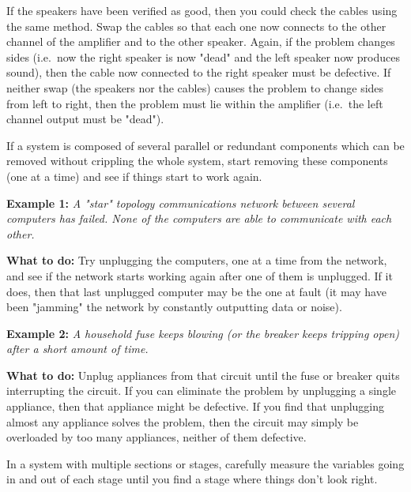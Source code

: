 If the speakers have been verified as good, then you could check the
cables using the same method. Swap the cables so that each one now
connects to the other channel of the amplifier and to the other speaker.
Again, if the problem changes sides (i.e.~now the right speaker is now
"dead" and the left speaker now produces sound), then the cable now
connected to the right speaker must be defective. If neither swap (the
speakers nor the cables) causes the problem to change sides from left to
right, then the problem must lie within the amplifier (i.e.~the left
channel output must be "dead").

\stopsubsection

\startsubsection[title={Remove Parallel
Components},reference={sec:xtocid15790979}]

If a system is composed of several parallel or redundant components
which can be removed without crippling the whole system, start removing
these components (one at a time) and see if things start to work again.

{\bf Example 1:} {\em A "star" topology communications network between
several computers has failed. None of the computers are able to
communicate with each other.}

{\bf What to do:} Try unplugging the computers, one at a time from the
network, and see if the network starts working again after one of them
is unplugged. If it does, then that last unplugged computer may be the
one at fault (it may have been "jamming" the network by constantly
outputting data or noise).

{\bf Example 2:} {\em A household fuse keeps blowing (or the breaker
keeps tripping open) after a short amount of time.}

{\bf What to do:} Unplug appliances from that circuit until the fuse or
breaker quits interrupting the circuit. If you can eliminate the problem
by unplugging a single appliance, then that appliance might be
defective. If you find that unplugging almost any appliance solves the
problem, then the circuit may simply be overloaded by too many
appliances, neither of them defective.

\stopsubsection

\startsubsection[title={Divide System into Sections and Test Those
Sections},reference={sec:xtocid157909710}]

In a system with multiple sections or stages, carefully measure the
variables going in and out of each stage until you find a stage where
things don't look right.

